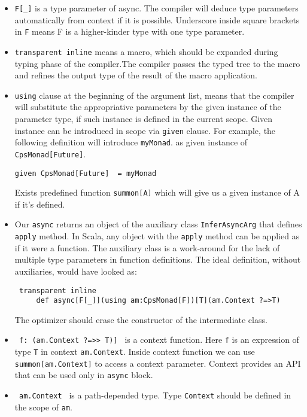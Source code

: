 \documentclass{llncs}
\begin{document}
\begin{itemize}
 \item \lstinline|F[_]| is a type parameter of async. The compiler will deduce type parameters automatically from context if it is possible.  Underscore inside square brackets in \lstinline|F| means  F is a higher-kinder type with one type parameter.
 \item \lstinline|transparent inline| means a macro, which should be expanded during typing phase of the compiler.The compiler passes the typed tree to the macro and refines the output type of the result of the macro application.
 \item \lstinline|using| clause at the beginning of the argument list, means that the compiler will substitute the appropriative parameters by the given instance of the parameter type,  if such instance is defined in the current scope.  
 Given instance can be introduced in scope via \lstinline|given| clause.  For example, the following definition  will introduce \lstinline|myMonad|. as given instance of \lstinline|CpsMonad[Future]|.
\begin{lstlisting}
given CpsMonad[Future]  = myMonad
\end{lstlisting}
  
  Exists predefined function \lstinline|summon[A]| which will give us a given instance of A if it's defined.
  
 \item Our \lstinline{async} returns an object of the auxiliary class
    \lstinline{InferAsyncArg} that defines \lstinline{apply} method.  In Scala,
    any object with the \lstinline{apply} method can be applied as if it were
    a function. The auxiliary class is a work-around for the lack of
    multiple type parameters in function definitions. The ideal
    definition, without auxiliaries, would have looked as:
\begin{lstlisting}
 transparent inline 
     def async[F[_]](using am:CpsMonad[F])[T](am.Context ?=>T)
\end{lstlisting}
The optimizer should erase the constructor of the intermediate class.  
  \item  \lstinline| f: (am.Context ?=>> T)] | is a context function. Here  \lstinline|f| is an expression of type \lstinline|T| in context  \lstinline|am.Context|.  Inside  context function we can use \lstinline|summon[am.Context]| to access a context parameter.
  Context provides an API that can be used only in \lstinline|async| block.
  \item \lstinline| am.Context | is a path-depended type.  Type \lstinline|Context| should be defined in the scope of \lstinline|am|.
\end{itemize} 
\end{document}
